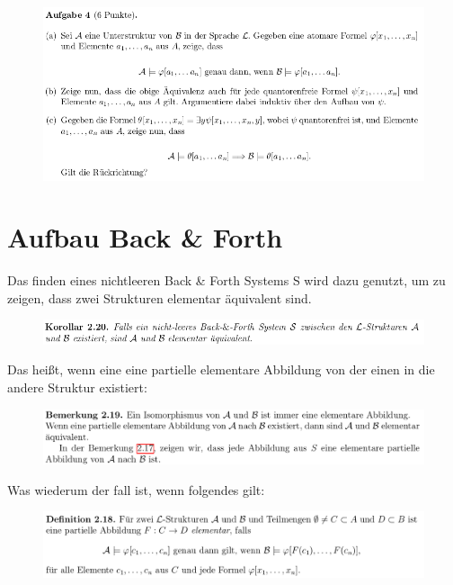\documentclass[a4paper]{scrartcl}
\begin{document}
\section*{}%
\label{sec:aufgabe_4}

    \begin{figure}[H]
        \centering
        \includegraphics[scale=0.6]{./A-4.png}
        \label{fig:}
    \end{figure}


\section*{Aufbau Back \& Forth}%
\label{sec:aufbau_back_forth}
    Das finden eines nichtleeren Back \& Forth Systems S wird dazu genutzt, um zu zeigen, dass zwei Strukturen elementar äquivalent sind.
    \begin{figure}[H]
        \centering
        \includegraphics[scale=0.6]{./B&F-EA.png}
        \label{fig:}
    \end{figure}

    Das heißt, wenn eine eine partielle elementare Abbildung von der einen in die andere Struktur existiert:
    
    \begin{figure}[H]
        \centering
        \includegraphics[scale=0.3]{./B&F-PEA.png}
        \label{fig:}
    \end{figure}

    Was wiederum der fall ist, wenn folgendes gilt:

    \begin{figure}[H]
        \centering
        \includegraphics[scale=0.3]{./B&F-E.png}
        \label{fig:}
    \end{figure}
\end{document}
